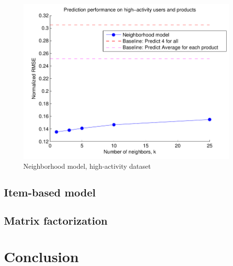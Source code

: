 \documentclass[letterpaper, 10 pt, twocolumn]{article}
\begin{document}
\begin{figure}[h]
\includegraphics[scale=0.6]{images/modelone_subset.pdf}
\caption{Neighborhood model, high-activity dataset}
\label{fig:modelone_subset}
\end{figure}

\subsection{Item-based model}
\subsection{Matrix factorization}

\section{Conclusion}
\end{document}
